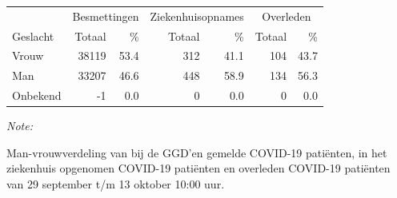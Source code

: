 \documentclass[
  english,
  man,floatsintext]{apa6}
\begin{document}
\begin{table}[H]
\centering\begingroup\fontsize{11}{13}\selectfont

\begin{threeparttable}
\begin{tabular}{lrrrrrr}
\toprule
\multicolumn{1}{c}{ } & \multicolumn{2}{c}{Besmettingen} & \multicolumn{2}{c}{Ziekenhuisopnames} & \multicolumn{2}{c}{Overleden} \\
\cmidrule(l{3pt}r{3pt}){2-3} \cmidrule(l{3pt}r{3pt}){4-5} \cmidrule(l{3pt}r{3pt}){6-7}
Geslacht & Totaal & \% & Totaal & \% & Totaal & \%\\
\midrule
Vrouw & 38119 & 53.4 & 312 & 41.1 & 104 & 43.7\\
Man & 33207 & 46.6 & 448 & 58.9 & 134 & 56.3\\
Onbekend & -1 & 0.0 & 0 & 0.0 & 0 & 0.0\\
\bottomrule
\end{tabular}
\begin{tablenotes}
\item \textit{Note: } 
\item Man-vrouwverdeling van bij de GGD’en gemelde COVID-19 patiënten, in het ziekenhuis opgenomen COVID-19 patiënten en overleden COVID-19 patiënten van 29 september t/m 13 oktober 10:00 uur.
\end{tablenotes}
\end{threeparttable}
\endgroup{}
\end{table}
\newpage
\end{document}
